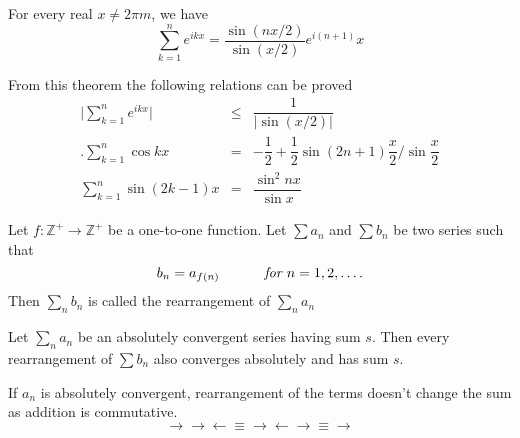 \documentclass[10pt,a4paper]{book}
\begin{document}
\begin{Thm}
For every real $x \neq 2\pi m$, we have
$$\sum_{k =1}^n e^{ikx} =  \dfrac{\sin (nx/2)}{\sin (x/2)}e^{i(n+1)}x$$
\end{Thm}
From this theorem the following relations can be proved
\begin{eqnarray*}
\bigg|\sum_{k =1 }^n e^{ikx}\bigg|&\leq&\dfrac{1}{|\sin (x/2)|}\\.
\sum_{k=1}^n \cos kx &=& -\dfrac{1}{2} + \dfrac{1}{2} \sin (2n +1)\dfrac{x}{2}\bigg/ \sin \dfrac{x}{2} \\
\sum_{k=1}^n \sin (2k -1 )x&=& \dfrac{\sin^2 nx}{\sin x}
\end{eqnarray*}

\begin{deff}
Let $f: \mathbb{Z}^+ \rightarrow \mathbb{Z}^+$ be a one-to-one function. Let $\sum a_n$ and $\sum b_n$ be two series such that
$$b_n = a_{f(n)} \sp \textit{ for } n =1,2, \dots.$$
Then $\sum_n b_n$ is called the rearrangement of $\sum_n a_n$

\end{deff}

\begin{Thm}
Let $\sum_n a_n$ be an absolutely convergent series having sum $s$. Then
every rearrangement of $\sum b_n$ also converges absolutely and has sum $s$.
\end{Thm}

\PP If $a_n$ is absolutely convergent, rearrangement of the terms doesn't change the sum as addition is commutative.
$$\longrightarrow\longrightarrow \longleftarrow \equiv \longrightarrow \longleftarrow \longrightarrow  \equiv \longrightarrow $$
\end{document}

